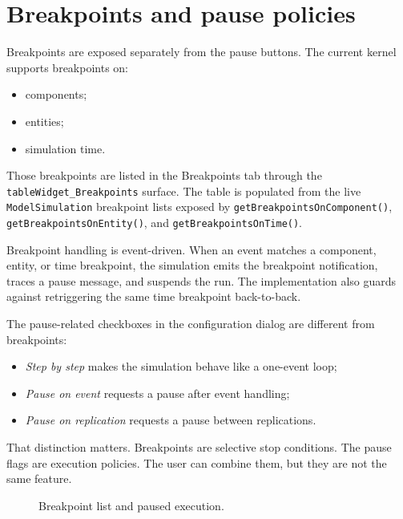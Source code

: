\section{Breakpoints and pause policies}
\label{sec:running-simulations-breakpoints}

Breakpoints are exposed separately from the pause buttons. The current kernel
supports breakpoints on:
\begin{itemize}
\item components;
\item entities;
\item simulation time.
\end{itemize}

Those breakpoints are listed in the Breakpoints tab through the
\texttt{tableWidget\_Breakpoints} surface. The table is populated from the live
\texttt{ModelSimulation} breakpoint lists exposed by
\texttt{getBreakpointsOnComponent()}, \texttt{getBreakpointsOnEntity()}, and
\texttt{getBreakpointsOnTime()}.

Breakpoint handling is event-driven. When an event matches a component, entity,
or time breakpoint, the simulation emits the breakpoint notification, traces a
pause message, and suspends the run. The implementation also guards against
retriggering the same time breakpoint back-to-back.

The pause-related checkboxes in the configuration dialog are different from
breakpoints:
\begin{itemize}
\item \textit{Step by step} makes the simulation behave like a one-event loop;
\item \textit{Pause on event} requests a pause after event handling;
\item \textit{Pause on replication} requests a pause between replications.
\end{itemize}

That distinction matters. Breakpoints are selective stop conditions. The pause
flags are execution policies. The user can combine them, but they are not the
same feature.

\begin{figure}[htbp]
\centering
\caption{Breakpoint list and paused execution.}
\label{fig:running-simulations-breakpoint}
\end{figure}

